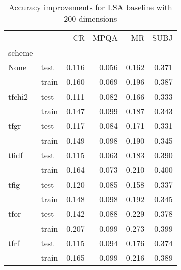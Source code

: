 \begin{table}[h]
\begin{center}

\begin{tabular}{llrrrr}
\toprule
{} &      &  CR &  MPQA &  MR &  SUBJ \\
scheme &  &            &              &            &              \\
\midrule
None & test &      0.116 &        0.056 &      0.162 &        0.371 \\
{} & train &      0.160 &        0.069 &      0.196 &        0.387 \\
tfchi2 & test &      0.111 &        0.082 &      0.166 &        0.333 \\
{} & train &      0.147 &        0.099 &      0.187 &        0.343 \\
tfgr & test &      0.117 &        0.084 &      0.171 &        0.331 \\
{} & train &      0.149 &        0.098 &      0.190 &        0.345 \\
tfidf & test &      0.115 &        0.063 &      0.183 &        0.390 \\
{} & train &      0.164 &        0.073 &      0.210 &        0.400 \\
tfig & test &      0.120 &        0.085 &      0.158 &        0.337 \\
{} & train &      0.148 &        0.098 &      0.192 &        0.345 \\
tfor & test &      0.142 &        0.088 &      0.229 &        0.378 \\
{} & train &      0.207 &        0.099 &      0.273 &        0.399 \\
tfrf & test &      0.115 &        0.094 &      0.176 &        0.374 \\
{} & train &      0.165 &        0.099 &      0.216 &        0.389 \\
\bottomrule
\end{tabular}

\caption[Accuracy improvements for LSA baseline with 200 dimensions]{Accuracy improvements for LSA baseline with 200 dimensions}
\label{tab:lsa:resuts:200}
\end{center}
\end{table}






